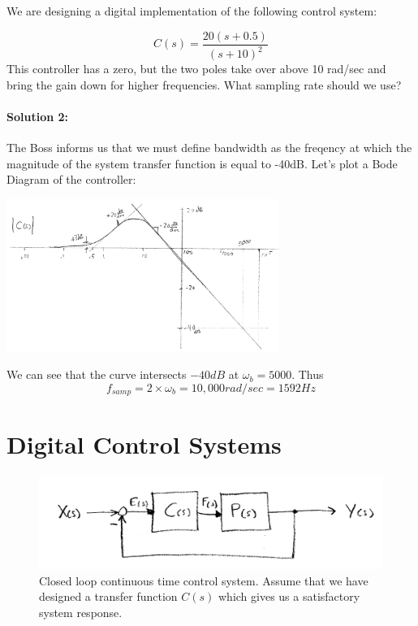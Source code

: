 \begin{ExampleSmall}
We are designing a digital implementation of the following control system: 

\[
C(s) = \frac  {20(s+0.5)}  {(s+10)^2}
\]
This controller has a zero, but the two poles take over above 10 rad/sec and bring the gain down for higher frequencies.  What sampling rate should we use?

\paragraph{Solution 2:}   The Boss informs us that we must define bandwidth as the freqency at which the magnitude of the system transfer function 
is equal to -40dB.  Let's plot a Bode Diagram of the controller:

\includegraphics[width=3.5in]{figs11/01118.png}

We can see that the curve intersects $-40dB$ at $\omega_b=5000$.   Thus
\[
f_{samp} = 2\times\omega_b =  10,000 rad/sec = 1592 Hz
\]
\end{ExampleSmall}


\section{Digital Control Systems}

 
\begin{figure}\centering
\includegraphics[width=5.0in]{figs11/ct_cl_sysa.png}
\caption{Closed loop continuous time control system.  Assume that we have designed a transfer function $C(s)$ which gives us a satisfactory system response.}\label{F:ct_cl}
\end{figure}
 
